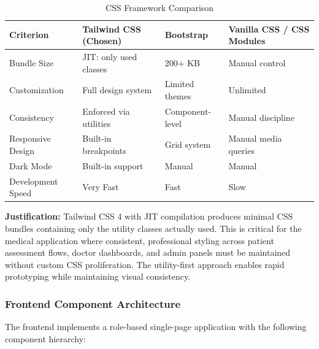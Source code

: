 \documentclass[12pt]{article}
\begin{document}
	\begin{table}[H]
		\centering
		\caption{CSS Framework Comparison}
		\small
		\begin{tabular}{|p{2.5cm}|p{2.5cm}|p{2.5cm}|p{2.5cm}|}
			\hline
			\textbf{Criterion} & \textbf{Tailwind CSS (Chosen)} & \textbf{Bootstrap} & \textbf{Vanilla CSS / CSS Modules} \\ \hline
			Bundle Size & JIT: only used classes & 200+ KB & Manual control \\ \hline
			Customization & Full design system & Limited themes & Unlimited \\ \hline
			Consistency & Enforced via utilities & Component-level & Manual discipline \\ \hline
			Responsive Design & Built-in breakpoints & Grid system & Manual media queries \\ \hline
			Dark Mode & Built-in support & Manual & Manual \\ \hline
			Development Speed & Very Fast & Fast & Slow \\ \hline
		\end{tabular}
	\end{table}

	\textbf{Justification:} Tailwind CSS 4 with JIT compilation produces minimal CSS bundles containing only the utility classes actually used. This is critical for the medical application where consistent, professional styling across patient assessment flows, doctor dashboards, and admin panels must be maintained without custom CSS proliferation. The utility-first approach enables rapid prototyping while maintaining visual consistency.

	\subsubsection{Frontend Component Architecture}

	The frontend implements a role-based single-page application with the following component hierarchy:
\end{document}
